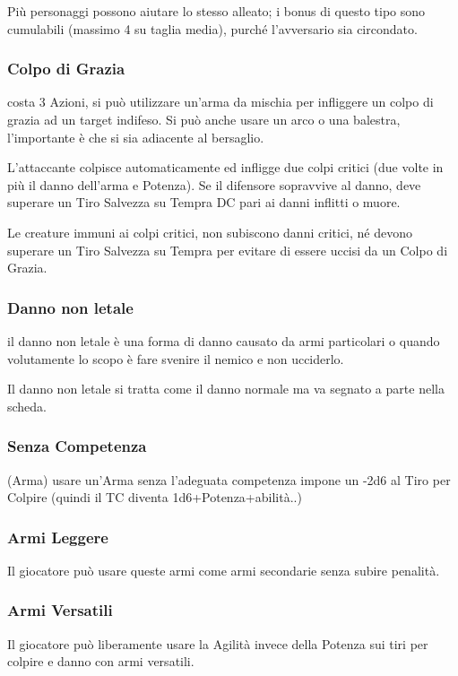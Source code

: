 \documentclass[a4paper,11pt,twoside,openany]{book}
\begin{document}
Più personaggi possono aiutare lo stesso alleato; i bonus di questo tipo sono cumulabili (massimo 4 su taglia media), purché l'avversario sia circondato.

\subsubsection{Colpo di Grazia} costa 3 Azioni, si può utilizzare un'arma da mischia per infliggere un colpo di grazia ad un target indifeso. Si può anche usare un arco o una balestra, l'importante è che si sia adiacente al bersaglio.

L'attaccante colpisce automaticamente ed infligge due colpi critici (due volte in più il danno dell'arma e Potenza). Se il difensore sopravvive al danno, deve superare un Tiro Salvezza su Tempra DC pari ai danni inflitti o muore.

Le creature immuni ai colpi critici, non subiscono danni critici, né devono superare un Tiro Salvezza su Tempra per evitare di essere uccisi da un Colpo di Grazia.

\subsubsection{Danno non letale} il danno non letale è una forma di danno causato da armi particolari o quando volutamente lo scopo è fare svenire il nemico e non ucciderlo.

Il danno non letale si tratta come il danno normale ma va segnato a parte nella scheda.

\subsubsection{Senza Competenza} (Arma) usare un'Arma senza l'adeguata competenza impone un -2d6 al Tiro per Colpire (quindi il TC diventa 1d6+Potenza+abilità..)

\subsubsection{Armi Leggere} Il giocatore può usare queste armi come armi secondarie senza subire penalità.

\subsubsection{Armi Versatili} Il giocatore può liberamente usare la Agilità invece della Potenza sui tiri per colpire e danno con armi versatili.
\end{document}
